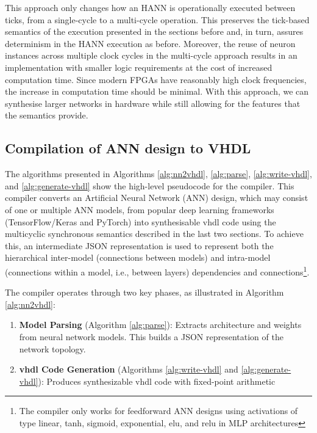 This approach only changes how an HANN is operationally executed between ticks, from a single-cycle to a multi-cycle operation. This preserves the tick-based semantics of the execution presented in the sections before and, in turn, assures determinism in the HANN execution as before. Moreover, the reuse of neuron instances across multiple clock cycles in the multi-cycle approach results in an implementation with smaller logic requirements at the cost of increased computation time. Since modern FPGAs have reasonably high clock frequencies, the increase in computation time should be minimal. With this approach, we can synthesise larger networks in hardware while still allowing for the features that the semantics provide.





\subsection{Compilation of ANN design to VHDL}


The algorithms presented in Algorithms \ref{alg:nn2vhdl}, \ref{alg:parse}, \ref{alg:write-vhdl}, and \ref{alg:generate-vhdl} show the high-level pseudocode for the compiler. This compiler converts an Artificial Neural Network (ANN) design, which may consist of one or multiple ANN models, from popular deep learning frameworks (TensorFlow/Keras and PyTorch) into synthesisable \gls{vhdl} code using the multicyclic synchronous semantics described in the last two sections. To achieve this, an intermediate JSON representation is used to represent both the hierarchical inter-model (connections between models) and intra-model (connections within a model, i.e., between layers) dependencies and connections\footnote{The compiler only works for feedforward ANN designs using activations of type linear, \gls{tanh}, sigmoid, exponential, \gls{elu}, and \gls{relu} in MLP architectures}. 

The compiler operates through two key phases, as illustrated in Algorithm \ref{alg:nn2vhdl}:

\begin{enumerate}
    \item \textbf{Model Parsing} (Algorithm \ref{alg:parse}): Extracts architecture and weights from neural network models. This builds a JSON representation of the network topology.
    \item \textbf{\gls{vhdl} Code Generation} (Algorithms \ref{alg:write-vhdl} and \ref{alg:generate-vhdl}): Produces synthesizable \gls{vhdl} code with fixed-point arithmetic
\end{enumerate}


